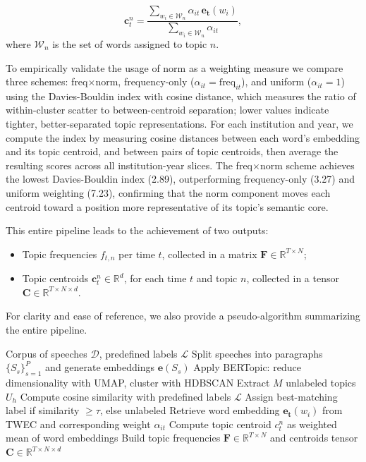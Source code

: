 \begin{equation}
    \mathbf{c}_t^n = \frac{\sum_{w_i \in \mathcal{W}_n} \alpha_{it} \, \mathbf{e_t}(w_i)}{\sum_{w_i \in \mathcal{W}_n} \alpha_{it}},
\end{equation}
where $\mathcal{W}_n$ is the set of words assigned to  topic $n$.

To empirically validate the usage of norm as a weighting measure we compare three schemes: freq$\times$norm, frequency-only ($\alpha_{it} = \text{freq}_{it}$), and uniform ($\alpha_{it} = 1$) using the Davies-Bouldin index \citep{davies1979cluster} with cosine distance, which measures the ratio of within-cluster scatter to between-centroid separation; lower values indicate tighter, better-separated topic representations. For each institution and year, we compute the index by measuring cosine distances between each word's embedding and its topic centroid, and between pairs of topic centroids, then average the resulting scores across all institution-year slices.
The freq$\times$norm scheme achieves the lowest Davies-Bouldin index (2.89), outperforming frequency-only (3.27) and uniform weighting (7.23), confirming that the norm component moves each centroid toward a position more representative of its topic's semantic core.

This entire pipeline leads to the achievement of two outputs:
\begin{itemize}
    \item Topic frequencies $f_{t,n}$ per time $t$, collected in a matrix $\mathbf{F} \in \mathbb{R}^{T \times N}$;
    \item Topic centroids $\mathbf{c}_t^n \in \mathbb{R}^d$, for each time $t$ and topic $n$, collected in a tensor $\mathbf{C} \in \mathbb{R}^{T \times N \times d}$.
\end{itemize}

For clarity and ease of reference, we also provide a pseudo-algorithm summarizing the entire pipeline.
\begin{algorithm}[H]
\caption{Topic Extraction Pipeline}
\label{alg:topic_pipeline_short}
\begin{algorithmic}[1]
\Require Corpus of speeches $\mathcal{D}$, predefined labels $\mathcal{L}$ 
\State Split speeches into paragraphs $\{S_s\}_{s=1}^P$ and generate embeddings $\mathbf{e}(S_s)$
\State Apply BERTopic: reduce dimensionality with UMAP, cluster with HDBSCAN
\State Extract $M$ unlabeled topics $U_h$
    \State Compute cosine similarity with predefined labels $\mathcal{L}$
    \State Assign best-matching label if similarity $\ge \tau$, else unlabeled
\EndFor
{}
    \State Retrieve word embedding $\mathbf{e_t}(w_i)$ from TWEC and corresponding weight $\alpha_{it}$
\EndFor
    \State Compute topic centroid $c_t^n$ as weighted mean of word embeddings
\EndFor
\EndFor
\State Build topic frequencies $\mathbf{F} \in \mathbb{R}^{T \times N}$ and centroids tensor $\mathbf{C} \in \mathbb{R}^{T \times N \times d}$
\end{algorithmic}
\end{algorithm}


